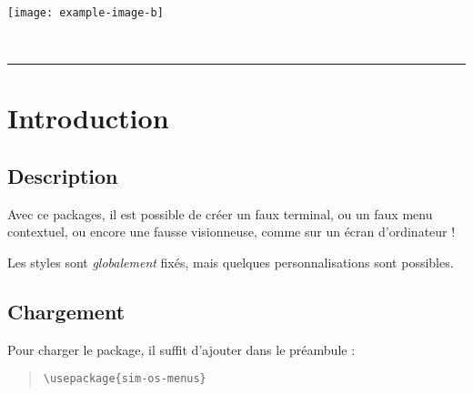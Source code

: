 \documentclass[11pt,a4paper]{ltxdoc}
\begin{document}
\begin{tcolorbox}[colframe=lightgray,colback=lightgray!5]
\begin{VisionnIMG}[Largeur=12cm]{}
\texttt{[image: example-image-b]}
\end{VisionnIMG}
\end{tcolorbox}

\begin{tcolorbox}[colframe=lightgray,colback=lightgray!5]
\end{tcolorbox}

\vfill~

\pagebreak


\hypertarget{matoc}{}

\tableofcontents

\vspace*{5mm}

\hrule

\vspace*{5mm}

\section{Introduction}

\subsection{Description}

Avec ce packages, il est possible de créer un \og faux \fg{} terminal, ou un \og faux \fg{} menu contextuel, ou encore une \og fausse \fg{} visionneuse, comme sur un écran d'ordinateur !

Les styles sont \textit{globalement} fixés, mais quelques personnalisations sont possibles.

\subsection{Chargement}

Pour charger le package, il suffit d'ajouter dans le préambule :

\begin{quote}
\begin{verbatim}
\usepackage{sim-os-menus}
\end{verbatim}
\end{quote}
\end{document}
